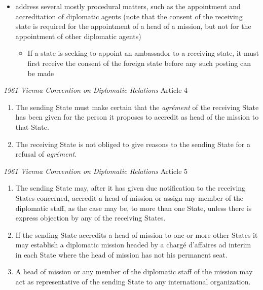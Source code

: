 \begin{itemize}
    \item {} address several mostly procedural matters, such as the appointment and accreditation of diplomatic agents (note that the consent of the receiving state is required for the appointment of a head of a mission, but not for the appointment of other diplomatic agents)
    \begin{itemize}
        \item If a state is seeking to appoint an ambassador to a receiving state, it must first receive the consent of the foreign state before any such posting can be made
    \end{itemize}
\end{itemize}

\begin{conventiondetails}{\textit{1961 Vienna Convention on Diplomatic Relations} Article 4}
    \flushleft
    \begin{enumerate}
        \item The sending State must make certain that the \textit{agrément} of the receiving State has been given for the person it proposes to accredit as head of the mission to that State.
        \item The receiving State is not obliged to give reasons to the sending State for a refusal of \textit{agrément}.
    \end{enumerate}
\end{conventiondetails}

\begin{conventiondetails}{\textit{1961 Vienna Convention on Diplomatic Relations} Article 5}
    \flushleft
    \begin{enumerate}
        \item The sending State may, after it has given due notification to the receiving States concerned, accredit a head of mission or assign any member of the diplomatic staff, as the case may be, to more than one State, unless there is express objection by any of the receiving States.
        \item If the sending State accredits a head of mission to one or more other States it may establish a diplomatic mission headed by a chargé d'affaires ad interim in each State where the head of mission has not his permanent seat.
        \item A head of mission or any member of the diplomatic staff of the mission may act as
        representative of the sending State to any international organization.
    \end{enumerate}
\end{conventiondetails}

